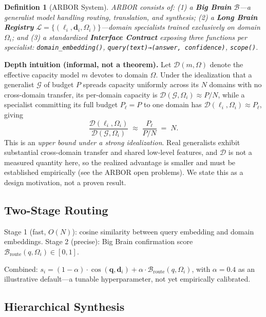 \documentclass[12pt]{article}
\newtheorem{definition}{Definition}
\begin{document}
\begin{definition}[ARBOR System]
ARBOR consists of: (1) a \textbf{Big Brain} $\mathcal{B}$---a generalist model handling routing, translation, and synthesis; (2) a \textbf{Long Brain Registry} $\mathcal{L} = \{(\ell_i, \mathbf{d}_i, \Omega_i)\}$---domain specialists trained exclusively on domain $\Omega_i$; and (3) a standardized \textbf{Interface Contract} exposing three functions per specialist: \texttt{domain\_embedding()}, \texttt{query(text)→(answer, confidence)}, \texttt{scope()}.
\end{definition}

\medskip
\noindent\textbf{Depth intuition (informal, not a theorem).}
Let $\mathcal{D}(m, \Omega)$ denote the effective capacity model $m$ devotes to domain $\Omega$. Under the idealization that a generalist $\mathcal{G}$ of budget $P$ spreads capacity uniformly across its $N$ domains with no cross-domain transfer, its per-domain capacity is $\mathcal{D}(\mathcal{G}, \Omega_i) \approx P/N$, while a specialist committing its full budget $P_\ell = P$ to one domain has $\mathcal{D}(\ell_i, \Omega_i) \approx P_\ell$, giving
\begin{equation}
\frac{\mathcal{D}(\ell_i, \Omega_i)}{\mathcal{D}(\mathcal{G}, \Omega_i)} \;\approx\; \frac{P_\ell}{P/N} \;=\; N .
\end{equation}
This is an \emph{upper bound under a strong idealization}. Real generalists exhibit substantial cross-domain transfer and shared low-level features, and $\mathcal{D}$ is not a measured quantity here, so the realized advantage is smaller and must be established empirically (see the ARBOR open problems). We state this as a design motivation, not a proven result.

\subsection{Two-Stage Routing}

Stage 1 (fast, $O(N)$): cosine similarity between query embedding and domain embeddings.
Stage 2 (precise): Big Brain confirmation score $\mathcal{B}_{\text{route}}(q, \Omega_i) \in [0,1]$.

Combined: $s_i = (1-\alpha) \cdot \cos(\mathbf{q}, \mathbf{d}_i) + \alpha \cdot \mathcal{B}_{\text{route}}(q, \Omega_i)$, with $\alpha = 0.4$ as an illustrative default---a tunable hyperparameter, not yet empirically calibrated.

\subsection{Hierarchical Synthesis}
\end{document}
